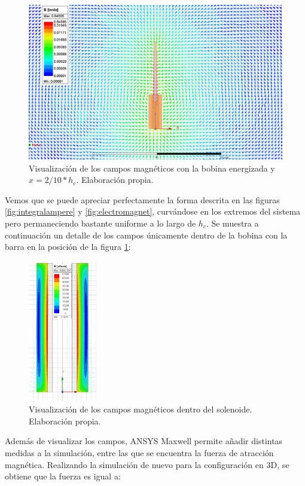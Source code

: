 \begin{figure}[H]
    \centering
    \includegraphics[width=14cm]{FigurasMemoria/fields8.PNG}
    \caption{Visualización de los campos magnéticos con la bobina energizada y \(x=2/10 * h_c\). Elaboración propia.}
    \label{fig:fields8} %
\end{figure}

Vemos que se puede apreciar perfectamente la forma descrita en las figuras \ref{fig:integralampere} y \ref{fig:electromagnet}, curvándose en los extremos del sistema pero permaneciendo bastante uniforme a lo largo de \(h_c\). Se muestra a continuación un detalle de los campos únicamente dentro de la bobina con la barra en la posición de la figura \ref{fig:fields8}:

\begin{figure}[H]
    \centering
    \includegraphics[width=3cm]{FigurasMemoria/fieldsDetail.jpg}
    \caption{Visualización de los campos magnéticos dentro del solenoide. Elaboración propia.}
    \label{fig:fieldsDetail} %
\end{figure}

Además de visualizar los campos, ANSYS Maxwell permite añadir distintas medidas a la simulación, entre las que se encuentra la fuerza de atracción magnética. Realizando la simulación de nuevo para la configuración en 3D, se obtiene que la fuerza es igual a:

